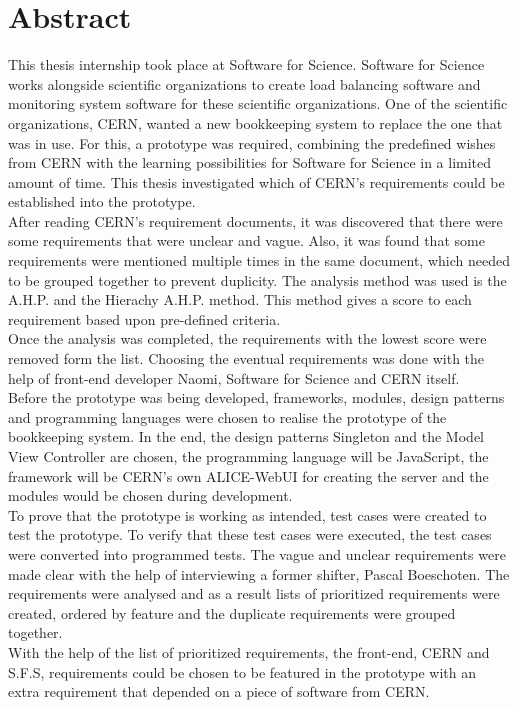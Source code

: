\documentclass[paper=a4, fontsize=11pt,twoside]{scrartcl}	%
\begin{document}
\newpage
\section*{Abstract}
This thesis internship took place at Software for Science. Software for Science works alongside scientific organizations to create load balancing software and monitoring system software for these scientific organizations. One of the scientific organizations, CERN, wanted a new bookkeeping system to replace the one that was in use. For this, a prototype was required, combining the predefined wishes from CERN with the learning possibilities for Software for Science in a limited amount of time. This thesis investigated which of CERN's requirements could be established into the prototype. \\ 
After reading CERN's requirement documents, it was discovered that there were some requirements that were unclear and vague. Also, it was found that some requirements were mentioned multiple times in the same document, which needed to be grouped together to prevent duplicity. The analysis method was used is the A.H.P. and the Hierachy A.H.P. method. This method gives a score to each requirement based upon pre-defined criteria. \\
Once the analysis was completed, the requirements with the lowest score were removed form the list. Choosing the eventual requirements was done with the help of front-end developer Naomi, Software for Science and CERN itself. \\ 
Before the prototype was being developed, frameworks, modules, design patterns and programming languages were chosen to realise the prototype of the bookkeeping system. In the end, the design patterns Singleton and the Model View Controller are chosen, the programming language will be JavaScript, the framework will be CERN's own ALICE-WebUI for creating the server and the modules would be chosen during development. \\
To prove that the prototype is working as intended, test cases were created to test the prototype. To verify that these test cases were executed, the test cases were converted into programmed tests. 
The vague and unclear requirements were made clear with the help of interviewing a former shifter, Pascal Boeschoten. The requirements were analysed and as a result lists of prioritized requirements were created, ordered by feature and the duplicate requirements were grouped together. \\
With the help of the list of prioritized requirements, the front-end, CERN and S.F.S, requirements could be chosen to be featured in the prototype with an extra requirement that depended on a piece of software from CERN. 
\end{document}

